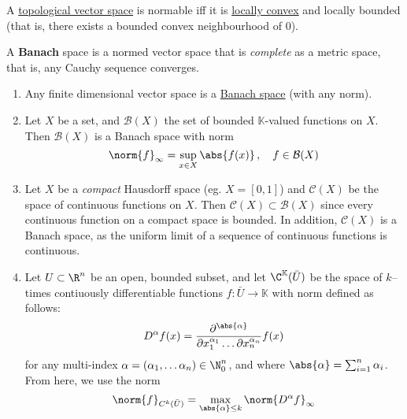 \documentclass{article}
\newcommand{\K}{\mathbb{K}}
\begin{document}
\begin{cor}
    A \hyperlink{def:topologicalVectorSpace}{topological vector space} is normable iff it is \hyperlink{def:locallyConvex}{locally convex} and locally bounded (that is, there exists a bounded convex neighbourhood of $0$).
\end{cor}

\begin{defi}
    A \textbf{Banach} space is a normed vector space that is \emph{complete} as a metric space, that is, any Cauchy sequence converges.
\end{defi}

\begin{eg} \leavevmode
    \begin{enumerate}[label=(\roman*)]
        \item Any finite dimensional vector space is a \hyperlink{def:banach}{Banach space} (with any norm).
        \item Let $X$ be a set, and $\mathcal{B}(X)$ the set of bounded $\K$-valued functions on $X$.
            Then $\mathcal{B}(X)$ is a Banach space with norm
            \begin{equation*}
                \norm{f}_\infty = \sup_{x \in X} \abs{f(x)} \, , \quad f \in \mathcal{B}(X)
            \end{equation*}
        \item Let $X$ be a \emph{compact} Hausdorff space (eg. $X = [0, 1]$) and $\mathcal{C}(X)$ be the space of continuous functions on $X$. Then $\mathcal{C}(X) \subset \mathcal{B}(X)$ since every continuous function on a compact space is bounded.
            In addition, $\mathcal{C}(X)$ is a Banach space, as the uniform limit of a sequence of continuous functions is continuous.
        \item Let $U \subset \R^n$ be an open, bounded subset, and let $\C^\K(\bar{U})$ be the space of $k$--times contiuously differentiable functions $f: \bar{U} \to \K$ with norm defined as follows:
            \begin{equation*}
                D^\alpha f(x) = \frac{\partial^{\abs{\alpha}}}{\partial x_1^{\alpha_1} \dots \partial x_n^{\alpha_n}} f(x)
            \end{equation*}
            for any multi-index $\alpha = (\alpha_1, \dotsc \alpha_n) \in \N_0^n$, and where $\abs{\alpha} = \sum_{i=1}^n \alpha_i$.  From here, we use the norm
            \begin{equation*}
                \norm{f}_{C^k(\bar{U})} = \max_{\abs{\alpha} \leq k} \norm {D^\alpha f}_\infty

\end{equation*}
\end{enumerate}
\end{eg}
\end{document}
